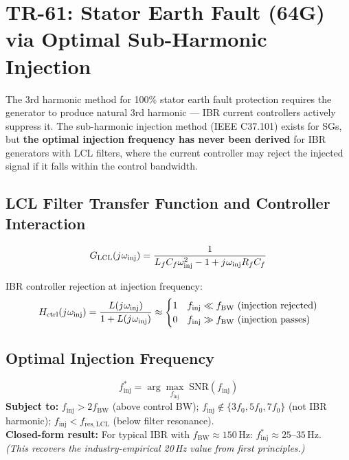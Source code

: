 \documentclass[12pt, a4paper]{report}
\newcommand{\jj}{j\mkern1mu}
\begin{document}
\section{TR-61: Stator Earth Fault (64G) via Optimal Sub-Harmonic Injection}

\begin{tcolorbox}[gapbox, title={Research Gap — TR-61}]
The 3rd harmonic method for 100\% stator earth fault protection requires the generator to produce natural 3rd harmonic — IBR current controllers actively suppress it. The sub-harmonic injection method (IEEE C37.101) exists for SGs, but \textbf{the optimal injection frequency has never been derived} for IBR generators with LCL filters, where the current controller may reject the injected signal if it falls within the control bandwidth.
\end{tcolorbox}

\subsection{LCL Filter Transfer Function and Controller Interaction}

\begin{equation}
  G_\mathrm{LCL}(\jj\omega_\mathrm{inj}) = \frac{1}{L_f C_f \omega_\mathrm{inj}^2 - 1 + \jj\omega_\mathrm{inj} R_f C_f}
\end{equation}

IBR controller rejection at injection frequency:
\begin{equation}
  H_\mathrm{ctrl}(\jj\omega_\mathrm{inj}) = \frac{L(\jj\omega_\mathrm{inj})}{1 + L(\jj\omega_\mathrm{inj})}
  \approx \begin{cases} 1 & f_\mathrm{inj} \ll f_\mathrm{BW} \text{ (injection rejected)} \\ 0 & f_\mathrm{inj} \gg f_\mathrm{BW} \text{ (injection passes)} \end{cases}
\end{equation}

\subsection{Optimal Injection Frequency}

\begin{tcolorbox}[mathbox]
\begin{equation}
  f_\mathrm{inj}^* = \arg\max_{f_\mathrm{inj}}\; \mathrm{SNR}(f_\mathrm{inj})
\end{equation}
\textbf{Subject to:} $f_\mathrm{inj} > 2f_\mathrm{BW}$ (above control BW); $f_\mathrm{inj} \notin \{3f_0, 5f_0, 7f_0\}$ (not IBR harmonic); $f_\mathrm{inj} < f_\mathrm{res,LCL}$ (below filter resonance).\\[4pt]
\textbf{Closed-form result:} For typical IBR with $f_\mathrm{BW} \approx 150\,\mathrm{Hz}$: $f_\mathrm{inj}^* \approx 25$--$35\,\mathrm{Hz}$.\\
\textit{(This recovers the industry-empirical 20\,Hz value from first principles.)}
\end{tcolorbox}
\end{document}
